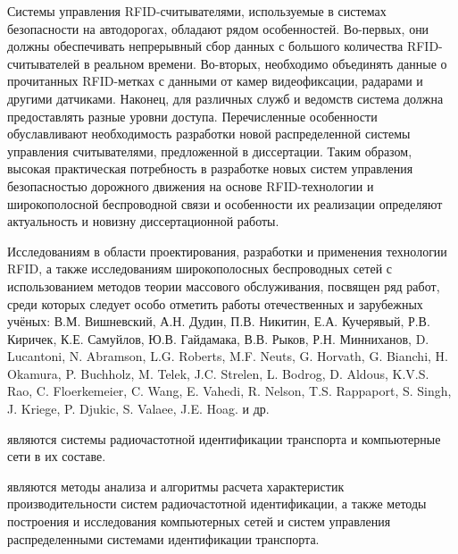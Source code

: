 Системы управления RFID-считывателями, используемые в системах безопасности на автодорогах, обладают рядом особенностей. Во-первых, они должны обеспечивать непрерывный сбор данных с большого количества RFID-считывателей в реальном времени. Во-вторых, необходимо объединять данные о прочитанных RFID-метках с данными от камер видеофиксации, радарами и другими датчиками. Наконец, для различных служб и ведомств система должна предоставлять разные уровни доступа. Перечисленные особенности обуславливают необходимость разработки новой распределенной системы управления считывателями, предложенной в диссертации. Таким образом, высокая практическая потребность в разработке новых систем управления безопасностью дорожного движения на основе RFID-технологии и широкополосной беспроводной связи и особенности их реализации определяют актуальность и новизну диссертационной работы.






Исследованиям в области проектирования, разработки и применения технологии RFID, а также исследованиям широкополосных беспроводных сетей с использованием методов теории массового обслуживания, посвящен ряд работ, среди которых следует особо отметить работы отечественных и зарубежных учёных: В.М. Вишневский, А.Н. Дудин, П.В. Никитин, Е.А. Кучерявый, Р.В. Киричек, К.Е. Самуйлов, Ю.В. Гайдамака, В.В. Рыков, Р.Н. Минниханов, D. Lucantoni, N. Abramson, L.G. Roberts, M.F. Neuts, G. Horvath, G. Bianchi,  H. Okamura, P. Buchholz, M. Telek, J.C. Strelen, L. Bodrog, D. Aldous, K.V.S. Rao, C. Floerkemeier, C. Wang, E. Vahedi, R. Nelson, T.S. Rappaport, S. Singh, J. Kriege, P. Djukic, S. Valaee, J.E. Hoag. и др.


{\object}
являются системы радиочастотной идентификации транспорта и компьютерные сети в их составе.

{\objective}
являются методы анализа и алгоритмы расчета характеристик производительности систем радиочастотной идентификации, а также методы построения и исследования компьютерных сетей и систем управления распределенными системами идентификации транспорта.

